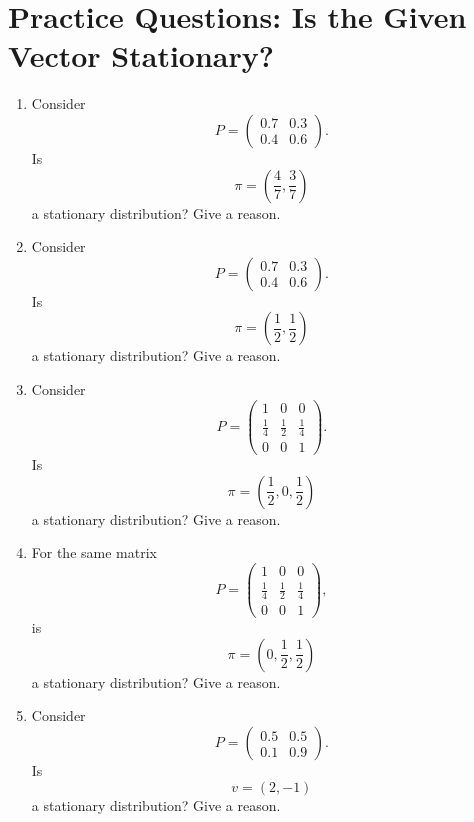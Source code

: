 \documentclass[12pt,a4paper]{article}
\theoremstyle{notestyle}
\begin{document}
\section{Practice Questions: Is the Given Vector Stationary?}

\begin{enumerate}[label=\textbf{Q\arabic*.}, leftmargin=1.2cm]
    \item Consider
    \[
    P=
    \begin{pmatrix}
    0.7 & 0.3\\
    0.4 & 0.6
    \end{pmatrix}.
    \]
    Is
    \[
    \pi=\left(\frac47,\frac37\right)
    \]
    a stationary distribution? Give a reason.

    \item Consider
    \[
    P=
    \begin{pmatrix}
    0.7 & 0.3\\
    0.4 & 0.6
    \end{pmatrix}.
    \]
    Is
    \[
    \pi=\left(\frac12,\frac12\right)
    \]
    a stationary distribution? Give a reason.

    \item Consider
    \[
    P=
    \begin{pmatrix}
    1 & 0 & 0\\
    \frac14 & \frac12 & \frac14\\
    0 & 0 & 1
    \end{pmatrix}.
    \]
    Is
    \[
    \pi=\left(\frac12,0,\frac12\right)
    \]
    a stationary distribution? Give a reason.

    \item For the same matrix
    \[
    P=
    \begin{pmatrix}
    1 & 0 & 0\\
    \frac14 & \frac12 & \frac14\\
    0 & 0 & 1
    \end{pmatrix},
    \]
    is
    \[
    \pi=\left(0,\frac12,\frac12\right)
    \]
    a stationary distribution? Give a reason.

    \item Consider
    \[
    P=
    \begin{pmatrix}
    0.5 & 0.5\\
    0.1 & 0.9
    \end{pmatrix}.
    \]
    Is
    \[
    v=(2,-1)
    \]
    a stationary distribution? Give a reason.
\end{enumerate}
\end{document}
